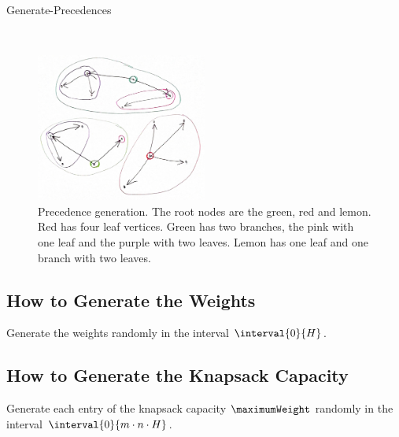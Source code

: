 \begin{algorithm}[ht]
    \caption{Generate-Precedences}
    \label{algorith:generate-precedences}
    \begin{algorithmic}[1]
        \\
    \end{algorithmic}
\end{algorithm}

\begin{figure}[ht]
    \centering
    \includegraphics[width=0.5\textwidth]{images/precedence_construction.jpg}
    \caption{Precedence generation. The root nodes are the green, red and lemon. Red has four leaf vertices. Green has two branches, the pink with one leaf and the purple with two leaves. Lemon has one leaf and one branch with two leaves.}
    \label{fig:precedence-generation}
\end{figure}

\subsection{How to Generate the Weights}

Generate the weights randomly in the interval $\interval{0}{H}$.

\subsection{How to Generate the Knapsack Capacity}

Generate each entry of the knapsack capacity $\maximumWeight$ randomly in the interval $\interval{0}{m \cdot n \cdot H}$.
